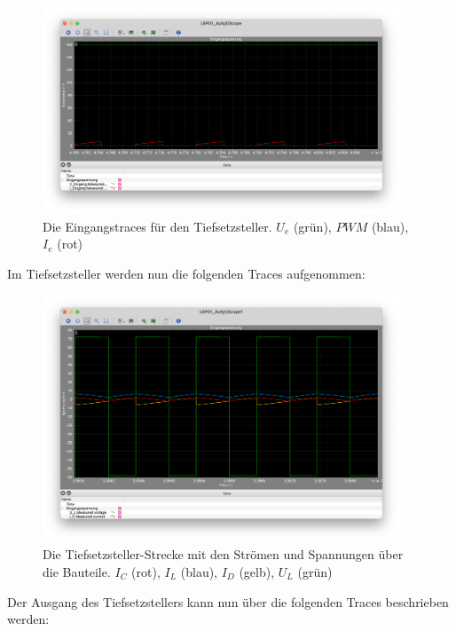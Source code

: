 \documentclass{report}
\begin{document}
\begin{figure}
  \begin{center}
    \includegraphics[width=0.95\textwidth]{assets/img/aufg1_eingang.png}
  \end{center}
  \caption{Die Eingangstraces für den Tiefsetzsteller. $U_e$ (grün), $PWM$ (blau), $I_e$ (rot)}
  \label{fig:aufg1_eingang}
\end{figure}

Im Tiefsetzsteller werden nun die folgenden Traces aufgenommen:

\begin{figure}
  \begin{center}
    \includegraphics[width=0.95\textwidth]{assets/img/aufg1_strecke.png}
  \end{center}
  \caption{Die Tiefsetzsteller-Strecke mit den Strömen und Spannungen über die Bauteile. $I_C$ (rot), $I_L$ (blau), $I_D$ (gelb), $U_L$ (grün)}
  \label{fig:aufg1_strecke}
\end{figure}

Der Ausgang des Tiefsetzstellers kann nun über die folgenden Traces beschrieben werden:
\end{document}
